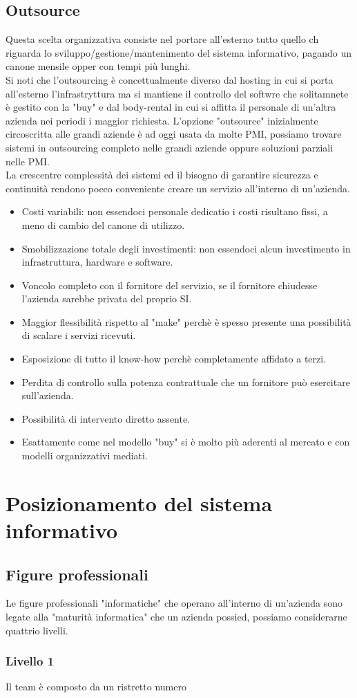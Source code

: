 \documentclass[../main.tex]{subfiles}
\begin{document}
	\subsection{Outsource}
	Questa scelta organizzativa consiste nel portare all'esterno tutto quello ch riguarda lo sviluppo/gestione/mantenimento del sistema informativo, pagando un canone mensile opper con tempi più lunghi.\\
	Si noti che l'outsourcing è concettualmente diverso dal hosting in cui si porta all'esterno l'infrastryttura ma si mantiene il controllo del softwre che solitamnete è gestito con la "buy" e dal body-rental in cui si affitta il personale di un'altra azienda nei periodi i maggior richiesta.
	L'opzione "outsource" inizialmente circoscritta alle grandi aziende è ad oggi usata da molte PMI, possiamo trovare sistemi in outsourcing completo nelle grandi aziende oppure soluzioni parziali nelle PMI.\\
	La crescentre complessità dei sistemi ed il bisogno di garantire sicurezza e continuità rendono pocco conveniente creare un servizio all'interno di un'azienda.
	\begin{itemize}
		\item Costi variabili: non essendoci personale dedicatio i costi risultano fissi, a meno di cambio del canone di utilizzo.
		\item Smobilizzazione totale degli investimenti: non essendoci alcun investimento in infrastruttura, hardware e software.
		\item Voncolo completo con il fornitore del servizio, se il fornitore chiudesse l'azienda sarebbe privata del proprio SI.
		\item Maggior flessibilità rispetto al "make" perchè è spesso presente una possibilità di scalare i servizi ricevuti.
		\item Esposizione di tutto il know-how perchè completamente affidato a terzi.
		\item Perdita di controllo sulla potenza contrattuale che un fornitore può esercitare sull'azienda.
		\item Possibilità di intervento diretto assente.
		\item Esattamente come nel modello "buy" si è molto più aderenti al mercato e con modelli organizzativi mediati.
	\end{itemize}

	\section{Posizionamento del sistema informativo}
	\subsection{Figure professionali}
	Le figure professionali "informatiche" che operano all'interno di un'azienda sono legate alla "maturità informatica" che un azienda possied,
	possiamo considerarne quattrio livelli.

	\subsubsection{Livello 1}
	Il team è composto da un ristretto numero 
\end{document}
